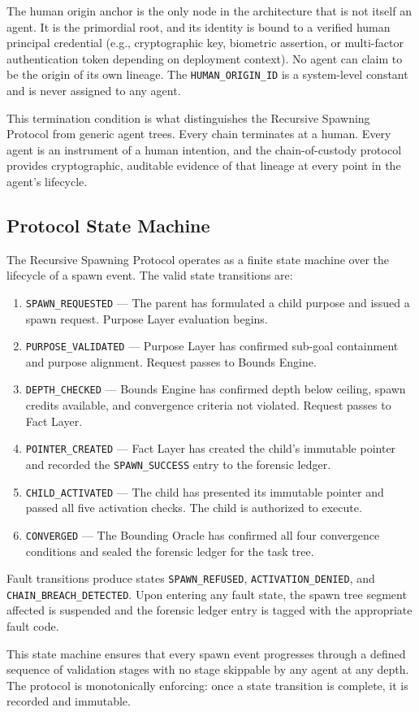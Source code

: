 The human origin anchor is the only node in the architecture that is not itself an agent. It is the primordial root, and its identity is bound to a verified human principal credential (e.g., cryptographic key, biometric assertion, or multi-factor authentication token depending on deployment context). No agent can claim to be the origin of its own lineage. The \texttt{HUMAN\_ORIGIN\_ID} is a system-level constant and is never assigned to any agent.

This termination condition is what distinguishes the Recursive Spawning Protocol from generic agent trees. Every chain terminates at a human. Every agent is an instrument of a human intention, and the chain-of-custody protocol provides cryptographic, auditable evidence of that lineage at every point in the agent's lifecycle.

\subsection{Protocol State Machine}

The Recursive Spawning Protocol operates as a finite state machine over the lifecycle of a spawn event. The valid state transitions are:

\begin{enumerate}
    \item \texttt{SPAWN\_REQUESTED} — The parent has formulated a child purpose and issued a spawn request. Purpose Layer evaluation begins.
    \item \texttt{PURPOSE\_VALIDATED} — Purpose Layer has confirmed sub-goal containment and purpose alignment. Request passes to Bounds Engine.
    \item \texttt{DEPTH\_CHECKED} — Bounds Engine has confirmed depth below ceiling, spawn credits available, and convergence criteria not violated. Request passes to Fact Layer.
    \item \texttt{POINTER\_CREATED} — Fact Layer has created the child's immutable pointer and recorded the \texttt{SPAWN\_SUCCESS} entry to the forensic ledger.
    \item \texttt{CHILD\_ACTIVATED} — The child has presented its immutable pointer and passed all five activation checks. The child is authorized to execute.
    \item \texttt{CONVERGED} — The Bounding Oracle has confirmed all four convergence conditions and sealed the forensic ledger for the task tree.
\end{enumerate}

Fault transitions produce states \texttt{SPAWN\_REFUSED}, \texttt{ACTIVATION\_DENIED}, and \texttt{CHAIN\_BREACH\_DETECTED}. Upon entering any fault state, the spawn tree segment affected is suspended and the forensic ledger entry is tagged with the appropriate fault code.

This state machine ensures that every spawn event progresses through a defined sequence of validation stages with no stage skippable by any agent at any depth. The protocol is monotonically enforcing: once a state transition is complete, it is recorded and immutable.